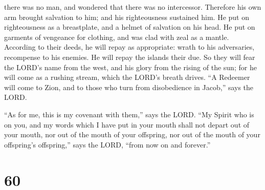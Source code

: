 there was no man, and wondered that there was no intercessor. Therefore
his own arm brought salvation to him; and his righteousness sustained
him.  He put on righteousness as a breastplate, and a
helmet of salvation on his head. He put on garments of vengeance for
clothing, and was clad with zeal as a mantle.  According to
their deeds, he will repay as appropriate: wrath to his adversaries,
recompense to his enemies. He will repay the islands their due.
 So they will fear the LORD's name from the west, and his
glory from the rising of the sun; for he will come as a rushing stream,
which the LORD's breath drives.  ``A Redeemer will come to
Zion, and to those who turn from disobedience in Jacob,'' says the LORD.

 ``As for me, this is my covenant with them,'' says the
LORD. ``My Spirit who is on you, and my words which I have put in your
mouth shall not depart out of your mouth, nor out of the mouth of your
offspring, nor out of the mouth of your offspring's offspring,'' says
the LORD, ``from now on and forever.''

\hypertarget{section-56}{%
\section{60}\label{section-56}}

